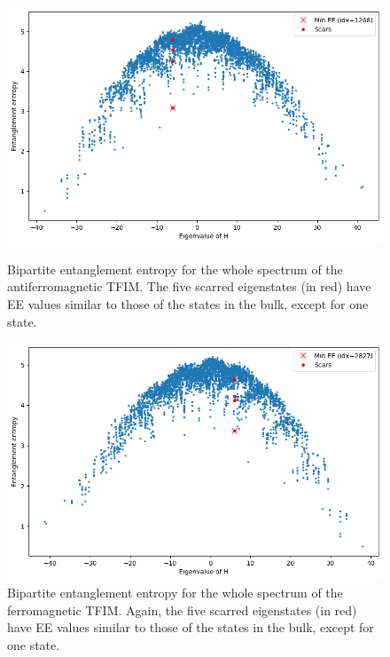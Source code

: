 \documentclass{article}
\begin{document}
\begin{figure}[h]
    \centering
    \begin{minipage}{0.45\textwidth}
        \centering
        \includegraphics[width=\linewidth]{ee_anti.png}
        \caption{Bipartite entanglement entropy for the whole spectrum of the antiferromagnetic TFIM. The five scarred eigenstates (in red) have EE values similar to those of the states in the bulk, except for one state.}
        \label{fig:ee_anti}
    \end{minipage}\hfill
    \begin{minipage}{0.45\textwidth}
        \centering
        \includegraphics[width=\linewidth]{ee_ferro.png}
        \caption{Bipartite entanglement entropy for the whole spectrum of the ferromagnetic TFIM. Again, the five scarred eigenstates (in red) have EE values similar to those of the states in the bulk, except for one state.}
        \label{fig:ee_ferro}
    \end{minipage}
\end{figure}
\end{document}
